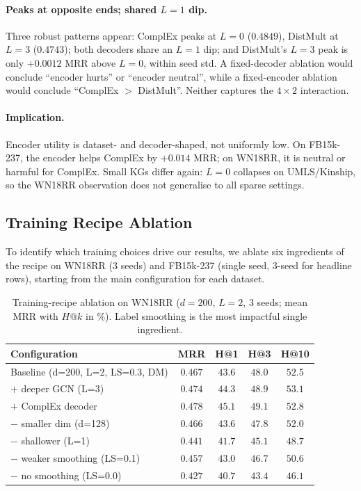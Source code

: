 \documentclass[runningheads]{llncs}
\begin{document}
\paragraph{Peaks at opposite ends; shared $L{=}1$ dip.}
Three robust patterns appear: ComplEx peaks at $L{=}0$ ($0.4849$), DistMult at $L{=}3$ ($0.4743$); both decoders share an $L{=}1$ dip; and DistMult's $L{=}3$ peak is only $+0.0012$ MRR above $L{=}0$, within seed std. A fixed-decoder ablation would conclude ``encoder hurts'' or ``encoder neutral'', while a fixed-encoder ablation would conclude ``ComplEx $>$ DistMult''. Neither captures the $4{\times}2$ interaction.

\paragraph{Implication.}
Encoder utility is dataset- and decoder-shaped, not uniformly low. On FB15k-237, the encoder helps ComplEx by $+0.014$ MRR; on WN18RR, it is neutral or harmful for ComplEx. Small KGs differ again: $L{=}0$ collapses on UMLS/Kinship, so the WN18RR observation does not generalise to all sparse settings.

\subsection{Training Recipe Ablation}
\label{sec:ablation}

To identify which training choices drive our results, we ablate six ingredients of the recipe on WN18RR (3 seeds) and FB15k-237 (single seed, 3-seed for headline rows), starting from the main configuration for each dataset.

\begin{table}[!htb]
\centering
\caption{Training-recipe ablation on WN18RR ($d{=}200$, $L{=}2$, 3 seeds; mean MRR with $H@k$ in \%). Label smoothing is the most impactful single ingredient.}
\label{tab:ablation-wn18rr}
\footnotesize
\setlength{\tabcolsep}{3pt}
\begin{tabular}{lcccc}
\toprule
Configuration & MRR & H@1 & H@3 & H@10 \\
\midrule
Baseline (d=200, L=2, LS=0.3, DM) & $0.467$ & $43.6$ & $48.0$ & $52.5$ \\
\midrule
$+$ deeper GCN (L=3)            & $\mathbf{0.474}$ & $44.3$ & $48.9$ & $\mathbf{53.1}$ \\
$+$ ComplEx decoder             & $\mathbf{0.478}$ & $\mathbf{45.1}$ & $\mathbf{49.1}$ & $52.8$ \\
$-$ smaller dim (d=128)         & $0.466$ & $43.6$ & $47.8$ & $52.0$ \\
$-$ shallower (L=1)             & $0.441$ & $41.7$ & $45.1$ & $48.7$ \\
$-$ weaker smoothing (LS=0.1)   & $0.457$ & $43.0$ & $46.7$ & $50.6$ \\
$-$ no smoothing (LS=0.0)       & $0.427$ & $40.7$ & $43.4$ & $46.1$ \\
\bottomrule
\end{tabular}
\end{table}
\end{document}
